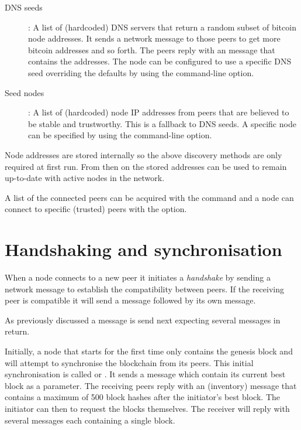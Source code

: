 \begin{description}
\item[DNS seeds]: A list of (hardcoded) DNS servers that return a random subset of bitcoin node addresses. It sends a  network message to those peers to get more bitcoin addresses and so forth. The peers reply with an  message that contains the addresses. The node can be configured to use a specific DNS seed overriding the defaults by using the  command-line option.
\item[Seed nodes]: A list of (hardcoded) node IP addresses from peers that are believed to be stable and trustworthy. This is a fallback to DNS seeds. A specific node can be specified by using the  command-line option.
\end{description}

Node addresses are stored internally so the above discovery methods are only required at first run. From then on the stored addresses can be used to remain up-to-date with active nodes in the network.

A list of the connected peers can be acquired with the  command and a node can connect to specific (trusted) peers with the  option.


\section{Handshaking and synchronisation}
When a node connects to a new peer it initiates a \emph{handshake} by sending a  network message to establish the compatibility between peers. If the receiving peer is compatible it will send a  message followed by its own  message.

As previously discussed a  message is send next expecting several  messages in return.

Initially, a node that starts for the first time only contains the genesis block and will attempt to synchronise the blockchain from its peers. This initial synchronisation is called  or . It sends a  message which contain its current best block as a parameter. The receiving peers reply with an  (inventory) message that contains a maximum of 500 block hashes after the initiator’s best block. The initiator can then  to request the blocks themselves. The receiver will reply with several  messages each containing a single block.


